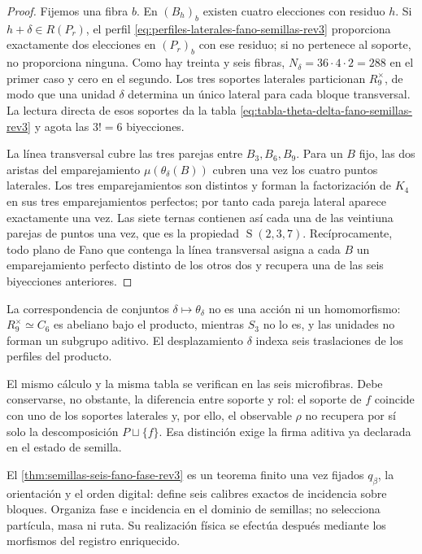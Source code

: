 \begin{proof}
Fijemos una fibra \(b\). En \((B_h)_b\) existen cuatro elecciones con
residuo \(h\). Si \(h+\delta\in R(P_r)\), el perfil
\eqref{eq:perfiles-laterales-fano-semillas-rev3} proporciona exactamente dos
elecciones en \((P_r)_b\) con ese residuo; si no pertenece al soporte, no
proporciona ninguna. Como hay treinta y seis fibras,
\(N_\delta=36\cdot4\cdot2=288\) en el primer caso y cero en el segundo.
Los tres soportes laterales particionan \(R_9^\times\), de modo que una unidad
\(\delta\) determina un único lateral para cada bloque transversal. La lectura
directa de esos soportes da la tabla
\eqref{eq:tabla-theta-delta-fano-semillas-rev3} y agota las \(3!=6\)
biyecciones.

La línea transversal cubre las tres parejas entre \(B_3,B_6,B_9\). Para un
\(B\) fijo, las dos aristas del emparejamiento \(\mu(\theta_\delta(B))\)
cubren una vez los cuatro puntos laterales. Los tres emparejamientos son
distintos y forman la factorización de \(K_4\) en sus tres emparejamientos
perfectos; por tanto cada
pareja lateral aparece exactamente una vez. Las siete ternas contienen así
cada una de las veintiuna parejas de puntos una vez, que es la propiedad
\(\operatorname{S}(2,3,7)\). Recíprocamente, todo plano de Fano que contenga
la línea transversal asigna a cada \(B\) un emparejamiento perfecto distinto
de los otros dos y recupera una de las seis biyecciones anteriores.
\end{proof}

La correspondencia de conjuntos \(\delta\mapsto\theta_\delta\) no es una
acción ni un homomorfismo: \(R_9^\times\simeq C_6\) es abeliano bajo el
producto, mientras \(S_3\) no lo es, y las unidades no forman un subgrupo
aditivo. El desplazamiento \(\delta\) indexa seis traslaciones de los perfiles
del producto.

El mismo cálculo y la misma tabla se verifican en las seis microfibras. Debe
conservarse, no obstante, la diferencia entre soporte y rol: el soporte de
\(f\) coincide con uno de los soportes laterales y, por ello, el observable
\(\rho\) no recupera por sí solo la descomposición \(P\sqcup\{f\}\). Esa
distinción exige la firma aditiva ya declarada en el estado de semilla.

\begin{statusbox}[title={Estatuto y alcance de la incidencia de Fano}]
El \cref{thm:semillas-seis-fano-fase-rev3} es un teorema finito una vez
fijados \(q_\beta\), la orientación y el orden digital: define seis calibres
exactos de incidencia sobre bloques. Organiza fase e incidencia en el dominio
de semillas; no selecciona partícula, masa ni ruta. Su realización física se
efectúa después mediante los morfismos del registro enriquecido.
\end{statusbox}

